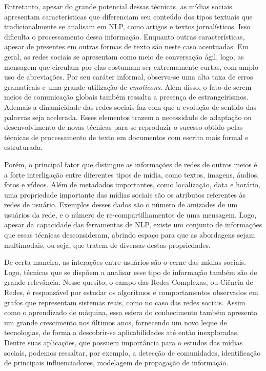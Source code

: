 Entretanto, apesar do grande potencial dessas técnicas, as mídias sociais
apresentam características que diferenciam seu conteúdo dos tipos textuais que
tradicionalmente se analisam em NLP, como artigos e textos jornalísticos.
Isso dificulta o processamento dessa informação.
Enquanto outras características, apesar de presentes em outras formas de texto
são neste caso acentuadas.
Em geral, as redes sociais se apresentam como meio de conversação ágil, logo,
as mensagem que circulam por elas costumam ser extremamente curtas, com amplo
uso de abreviações.
Por seu caráter informal, observa-se uma alta taxa de erros gramaticais e
uma grande utilização de \textit{emoticons}.
Além disso, o fato de serem meios de comunicação globais também ressalta a presença
de estrangeirismos.
Ademais a dinamicidade das redes sociais faz com que a evolução de sentido das
palavras seja acelerada.
Esses elementos trazem a necessidade de adaptação ou desenvolvimento de novas
técnicas para se reproduzir o sucesso obtido pelas técnicas de processamento de
texto em documentos com escrita mais formal e estruturada.

Porém, o principal fator que distingue as informações de redes de outros meios é
a forte interligação entre diferentes tipos de mídia, como textos, imagens,
áudios, fotos e vídeos.
Além de metadados importantes, como localização, data e horário, uma propriedade
importante das mídias sociais são os atributos referentes às redes de usuário.
Exemplos desses dados são o número de amizades de um usuários da rede, e o
número de re-compartilhamentos de uma mensagem.
Logo, apesar da capacidade das ferramentas de NLP, existe um conjunto de
informações que essas técnicas desconsideram, abrindo espaço para que as
abordagens sejam multimodais, ou seja, que tratem de diversas destas
propriedades.

De certa maneira, as interações entre usuários são o cerne das mídias sociais.
Logo, técnicas que se dispõem a analisar esse tipo de informação também são de
grande relevância.
Nesse quesito, o campo das Redes Complexas, ou Ciência de Redes, é responsável
por estudar os algoritmos e comportamentos observados em grafos que representam
sistemas reais, como no caso das redes sociais.
Assim como o aprendizado de máquina, essa esfera do conhecimento também
apresenta um grande crescimento nos últimos anos, fornecendo um novo leque de
tecnologias, de forma a descobrir-se aplicabilidades até então inexploradas.
Dentre suas aplicações, que possuem importância para o estudos das mídias
sociais, podemos ressaltar, por exemplo, a detecção de comunidades, identificação de
principais influenciadores, modelagem de propagação de informação.

